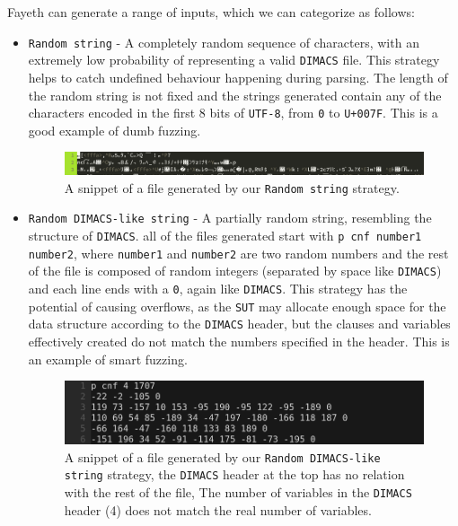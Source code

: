 \documentclass{article}
\begin{document}
Fayeth can generate a range of inputs, which we can categorize as follows:

\begin{itemize}

		\item \verb|Random string| - A completely random sequence of characters, with an extremely low probability of representing a valid \texttt{DIMACS} file. This strategy helps to catch undefined behaviour happening during parsing.
		The length of the random string is not fixed and the strings generated contain any of the characters encoded in the first 8 bits of \texttt{UTF-8}, from \texttt{0} to \texttt{U+007F}. This is a good example of dumb fuzzing.
		\begin{figure}[H]
			\centering
			\includegraphics[width=0.9\linewidth]{"random string"}
			\caption{A snippet of a file generated by our \texttt{Random string} strategy.}
			\label{fig:random-string}
		\end{figure}
		
		\item \verb|Random DIMACS-like string| - A partially random string, resembling the structure of \texttt{DIMACS}. all of the 
		files generated start with \texttt{p cnf number1 number2}, where \texttt{number1} and \texttt{number2} are two random numbers
		and the rest of the file is composed of random integers (separated by space like \texttt{DIMACS}) and each line ends with a \texttt{0}, again like \texttt{DIMACS}. 
		This strategy has the potential of causing overflows, as the \texttt{SUT} may allocate enough space for the data structure according to the \texttt{DIMACS} header, but the clauses and variables effectively created do not match the numbers specified in the header.
		This is an example of smart fuzzing.
		\begin{figure}[H]
			\centering
			\includegraphics[width=0.8\linewidth]{"random semi dimacs"}
			\caption{A snippet of a file generated by our \texttt{Random DIMACS-like string} strategy, the \texttt{DIMACS} header at the top has no relation with the rest of the file, The number of variables in the \texttt{DIMACS} header (4) does not match the real number of variables.}
			\label{fig:random-dimacs-like}
		\end{figure}
		

\end{itemize}
\end{document}

